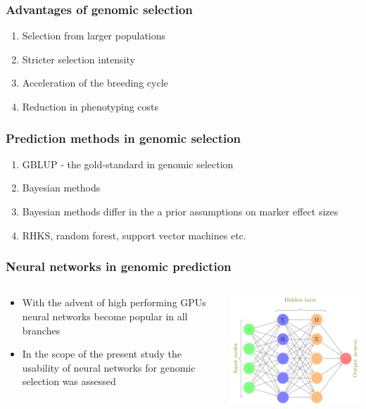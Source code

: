 \documentclass{beamer}
\begin{document}
\begin{frame}
  \frametitle{Advantages of genomic selection}
  \begin{enumerate}[<+->]
  \item Selection from larger populations
  \item Stricter selection intensity 
  \item Acceleration of the breeding cycle
  \item Reduction in phenotyping costs
  \end{enumerate}
\end{frame}


\begin{frame}
  \frametitle{Prediction methods in genomic selection}
  \begin{enumerate}[<+->]
  \item GBLUP - the gold-standard in genomic selection
  \item Bayesian methods
  \item Bayesian methods differ in the a prior assumptions on marker effect sizes
  \item RHKS, random forest, support vector machines etc.
  \end{enumerate}    
\end{frame}
 
\begin{frame}
   \frametitle{Neural networks in genomic prediction}
   \begin{columns}
     \begin{column}{0.5\textwidth}
       \begin{itemize}
       \item With the advent of high performing GPUs neural networks become popular in all branches
         \item In the scope of the present study the usability of neural networks for genomic selection was assessed 
       \end{itemize}
     \end{column}
     \begin{column}{0.5\textwidth}
        \includegraphics[height=.6\textheight,width=.9\textwidth]{neuralnet}
     \end{column}
   \end{columns}
\end{frame}
 
\end{document}
